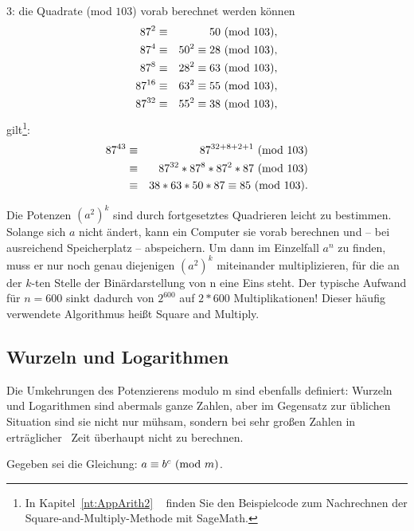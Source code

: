\begin{refsegment}
\begin{example}{ 3:}
die Quadrate (mod $103$) vorab berechnet werden können
\begin{eqnarray*}
87^2 & \equiv & 50 {\rm ~(mod~}103),\\
87^4 & \equiv & 50^2 \equiv 28 {\rm ~(mod~}103),\\
87^8 & \equiv & 28^2 \equiv 63 {\rm ~(mod~}103),\\
87^{16} & \equiv & 63^2 \equiv 55 {\rm ~(mod~}103),\\
87^{32} & \equiv & 55^2 \equiv 38 {\rm ~(mod~}103),
\end{eqnarray*}
gilt\footnote{%
  In Kapitel~\ref{nt:AppArith2} \glqq {}\grqq~
  finden Sie den Beispielcode
  zum Nachrechnen der Square-and-Multiply-Methode mit SageMath.
}:
\label{SrcArith2}
\begin{eqnarray*}
87^{43} & \equiv & 87^{32+8+2+1}{\rm ~(mod~}103) \nonumber\\
        & \equiv & 87^{32} * 87^8 * 87^2 * 87 {\rm ~(mod~}103) \nonumber\\
    & \equiv & 38 * 63 * 50 * 87 \equiv 85 {\rm ~(mod~}103). \nonumber
\end{eqnarray*}
\end{example}

Die Potenzen $(a^2)^k$ sind durch fortgesetztes Quadrieren leicht zu bestimmen.
Solange sich $a$ nicht ändert, kann ein Computer sie vorab berechnen und --
bei ausreichend Speicherplatz -- abspeichern. Um dann im Einzelfall $a^n$ zu
finden, muss er nur noch genau diejenigen $(a^2)^k$ miteinander multiplizieren,
für die an der $k$-ten Stelle der Binärdarstellung von n eine Eins steht. Der
typische Aufwand für $n=600$ sinkt dadurch von $2^{600}$ auf $2*600$ Multiplikationen!
Dieser häufig verwendete Algorithmus heißt \glqq Square and Multiply\grqq. 



\subsection{Wurzeln und Logarithmen} 

Die Umkehrungen des Potenzierens modulo m sind ebenfalls definiert: Wurzeln und
Logarithmen sind abermals ganze Zahlen, aber im Gegensatz zur üblichen
Situation sind sie nicht nur mühsam, sondern bei sehr großen Zahlen in
\glqq erträglicher\grqq~ Zeit überhaupt nicht zu berechnen.

Gegeben sei die Gleichung: $a \equiv b^c{\rm ~(mod~}m)$.


\end{refsegment}
